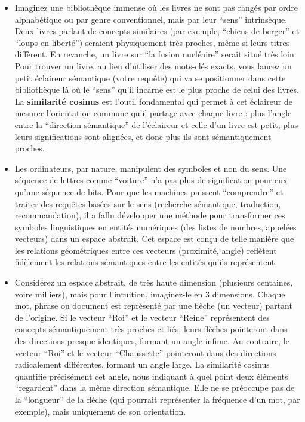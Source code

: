 \documentclass[11pt,a4paper]{report}
\begin{document}
\begin{itemize}
\item
  Imaginez une bibliothèque immense où les livres ne sont pas rangés par
  ordre alphabétique ou par genre conventionnel, mais par leur ``sens''
  intrinsèque. Deux livres parlant de concepts similaires (par exemple,
  ``chiens de berger'' et ``loups en liberté'') seraient physiquement
  très proches, même si leurs titres diffèrent. En revanche, un livre
  sur ``la fusion nucléaire'' serait situé très loin. Pour trouver un
  livre, au lieu d'utiliser des mots-clés exacts, vous lancez un petit
  éclaireur sémantique (votre requête) qui va se positionner dans cette
  bibliothèque là où le ``sens'' qu'il incarne est le plus proche de
  celui des livres. La \textbf{similarité cosinus} est l'outil
  fondamental qui permet à cet éclaireur de mesurer l'orientation
  commune qu'il partage avec chaque livre : plus l'angle entre la
  ``direction sémantique'' de l'éclaireur et celle d'un livre est petit,
  plus leurs significations sont alignées, et donc plus ils sont
  sémantiquement proches.
\item
  Les ordinateurs, par nature, manipulent des symboles et non du sens.
  Une séquence de lettres comme ``voiture'' n'a pas plus de
  signification pour eux qu'une séquence de bits. Pour que les machines
  puissent ``comprendre'' et traiter des requêtes basées sur le sens
  (recherche sémantique, traduction, recommandation), il a fallu
  développer une méthode pour transformer ces symboles linguistiques en
  entités numériques (des listes de nombres, appelées vecteurs) dans un
  espace abstrait. Cet espace est conçu de telle manière que les
  relations géométriques entre ces vecteurs (proximité, angle) reflètent
  fidèlement les relations sémantiques entre les entités qu'ils
  représentent.
\item
  Considérez un espace abstrait, de très haute dimension (plusieurs
  centaines, voire milliers), mais pour l'intuition, imaginez-le en 3
  dimensions. Chaque mot, phrase ou document est représenté par une
  flèche (un vecteur) partant de l'origine. Si le vecteur ``Roi'' et le
  vecteur ``Reine'' représentent des concepts sémantiquement très
  proches et liés, leurs flèches pointeront dans des directions presque
  identiques, formant un angle infime. Au contraire, le vecteur ``Roi''
  et le vecteur ``Chaussette'' pointeront dans des directions
  radicalement différentes, formant un angle large. La similarité
  cosinus quantifie précisément cet angle, nous indiquant à quel point
  deux éléments ``regardent'' dans la même direction sémantique. Elle ne
  se préoccupe pas de la ``longueur'' de la flèche (qui pourrait
  représenter la fréquence d'un mot, par exemple), mais uniquement de
  son orientation.
\end{itemize}
\end{document}
